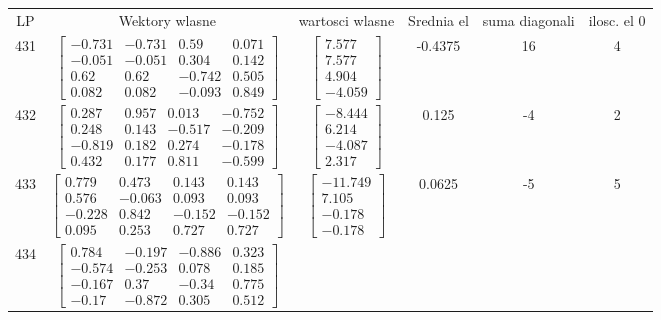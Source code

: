 \documentclass[a4paper,12pt]{article}
\begin{document}
\bgroup {} \vspace{0.2in} \begin{tabular}{c c c c c c}
LP &Wektory wlasne & wartosci wlasne & Srednia el & suma diagonali & ilosc. el 0\\
431
&
$\begin{bmatrix} -0.731 & -0.731 & 0.59 & 0.071 \\ -0.051 & -0.051 & 0.304 & 0.142 \\ 0.62 & 0.62 & -0.742 & 0.505 \\ 0.082 & 0.082 & -0.093 & 0.849 \end{bmatrix}$
&
$\begin{bmatrix} 7.577 \\ 7.577 \\ 4.904 \\ -4.059 \end{bmatrix}$
&
-0.4375
&
16
&
4
\\
432
&
$\begin{bmatrix} 0.287 & 0.957 & 0.013 & -0.752 \\ 0.248 & 0.143 & -0.517 & -0.209 \\ -0.819 & 0.182 & 0.274 & -0.178 \\ 0.432 & 0.177 & 0.811 & -0.599 \end{bmatrix}$
&
$\begin{bmatrix} -8.444 \\ 6.214 \\ -4.087 \\ 2.317 \end{bmatrix}$
&
0.125
&
-4
&
2
\\
433
&
$\begin{bmatrix} 0.779 & 0.473 & 0.143 & 0.143 \\ 0.576 & -0.063 & 0.093 & 0.093 \\ -0.228 & 0.842 & -0.152 & -0.152 \\ 0.095 & 0.253 & 0.727 & 0.727 \end{bmatrix}$
&
$\begin{bmatrix} -11.749 \\ 7.105 \\ -0.178 \\ -0.178 \end{bmatrix}$
&
0.0625
&
-5
&
5
\\
434
&
$\begin{bmatrix} 0.784 & -0.197 & -0.886 & 0.323 \\ -0.574 & -0.253 & 0.078 & 0.185 \\ -0.167 & 0.37 & -0.34 & 0.775 \\ -0.17 & -0.872 & 0.305 & 0.512 \end{bmatrix}$

\end{tabular}
\end{document}
